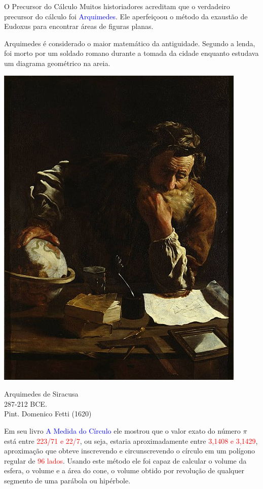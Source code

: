 \begin{frame}[label=area-circulo]{O Precursor do Cálculo}
	Muitos historiadores acreditam que  o verdadeiro precursor do cálculo foi \textcolor{blue}{Arquimedes}. Ele aperfeiçoou o método da exaustão de Eudoxus para  encontrar áreas de figuras planas. 
\medskip

Arquimedes é considerado o maior matemático da antiguidade. Segundo a lenda, foi morto por um soldado romano durante a tomada da cidade enquanto estudava um diagrama geométrico na areia.
\smallskip

	\begin{minipage}{0.3\linewidth}
		
	\begin{center}
		\includegraphics[scale=0.15]{arquimedes.jpg}
		
		{\tiny Arquimedes de Siracusa \\ 287-212 BCE. \\ Pint. Domenico Fetti (1620)}
	\end{center}
	
	\end{minipage}
\begin{minipage}{0.65\linewidth}
	 
	
	Em seu livro \textcolor{blue}{A Medida do Círculo} ele mostrou que o valor exato do número $\pi$   está entre \textcolor{red}{223/71 e 22/7}, ou seja, estaria aproximadamente entre \textcolor{red}{3,1408 e 3,1429}, aproximação que obteve inscrevendo e circunscrevendo o círculo em um polígono regular de \textcolor{red}{96 lados}. Usando este método ele foi capaz de calcular o volume da esfera, o volume e a área do cone, o volume obtido por revolução de qualquer segmento de uma parábola ou hipérbole.
\end{minipage}
\end{frame}


